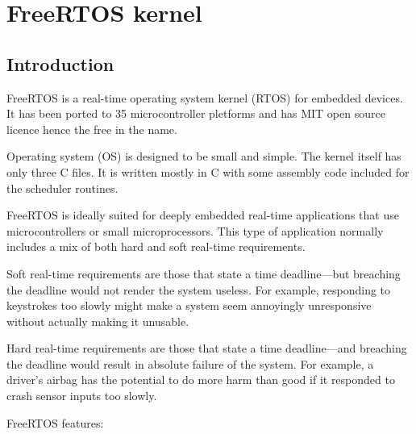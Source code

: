 \chapter{FreeRTOS kernel}
\label{freertos_kernel}

\section{Introduction}

FreeRTOS is a real-time operating system kernel (RTOS) for embedded devices. It has been ported to 35 microcontroller pletforms and has MIT open source licence hence the free in the name. \citep{freertos_licence}

Operating system (OS) is designed to be small and simple. The kernel itself has only three C files. It is written mostly in C with some assembly code included for the scheduler routines.

FreeRTOS is ideally suited for deeply embedded real-time applications that use
microcontrollers or small microprocessors. This type of application normally includes a mix of
both hard and soft real-time requirements. \citep{freertos_mastering}

Soft real-time requirements are those that state a time deadline—but breaching the deadline
would not render the system useless. For example, responding to keystrokes too slowly might
make a system seem annoyingly unresponsive without actually making it unusable. \citep{freertos_mastering}

Hard real-time requirements are those that state a time deadline—and breaching the deadline
would result in absolute failure of the system. For example, a driver’s airbag has the potential
to do more harm than good if it responded to crash sensor inputs too slowly. \citep{freertos_mastering}

\noindent FreeRTOS features:

